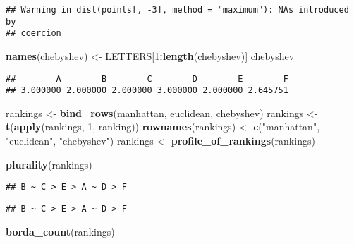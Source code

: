 \documentclass[]{article}
\newenvironment{Shaded}{\begin{snugshade}}{\end{snugshade}}
\newcommand{\DecValTok}[1]{\textcolor[rgb]{0.00,0.00,0.81}{#1}}
\newcommand{\KeywordTok}[1]{\textcolor[rgb]{0.13,0.29,0.53}{\textbf{#1}}}
\newcommand{\NormalTok}[1]{#1}
\newcommand{\OperatorTok}[1]{\textcolor[rgb]{0.81,0.36,0.00}{\textbf{#1}}}
\newcommand{\StringTok}[1]{\textcolor[rgb]{0.31,0.60,0.02}{#1}}
\begin{document}
\begin{verbatim}
## Warning in dist(points[, -3], method = "maximum"): NAs introduced by
## coercion
\end{verbatim}

\begin{Shaded}
\begin{Highlighting}[]
\KeywordTok{names}\NormalTok{(chebyshev) <-}\StringTok{ }\NormalTok{LETTERS[}\DecValTok{1}\OperatorTok{:}\KeywordTok{length}\NormalTok{(chebyshev)]}
\NormalTok{chebyshev}
\end{Highlighting}
\end{Shaded}

\begin{verbatim}
##        A        B        C        D        E        F 
## 3.000000 2.000000 2.000000 3.000000 2.000000 2.645751
\end{verbatim}

\begin{Shaded}
\begin{Highlighting}[]
\NormalTok{rankings <-}\StringTok{ }\KeywordTok{bind_rows}\NormalTok{(manhattan, }
\NormalTok{          euclidean,}
\NormalTok{          chebyshev)}
\NormalTok{rankings <-}\StringTok{ }\KeywordTok{t}\NormalTok{(}\KeywordTok{apply}\NormalTok{(rankings, }\DecValTok{1}\NormalTok{, ranking))}
\KeywordTok{rownames}\NormalTok{(rankings) <-}\StringTok{ }\KeywordTok{c}\NormalTok{(}\StringTok{"manhattan"}\NormalTok{, }\StringTok{"euclidean"}\NormalTok{, }\StringTok{"chebyshev"}\NormalTok{)}
\NormalTok{rankings <-}\StringTok{ }\KeywordTok{profile_of_rankings}\NormalTok{(rankings)}
\end{Highlighting}
\end{Shaded}

\begin{Shaded}
\begin{Highlighting}[]
\KeywordTok{plurality}\NormalTok{(rankings)}
\end{Highlighting}
\end{Shaded}

\begin{verbatim}
## B ~ C > E > A ~ D > F
\end{verbatim}

\begin{verbatim}
## B ~ C > E > A ~ D > F
\end{verbatim}

\begin{Shaded}
\begin{Highlighting}[]
\KeywordTok{borda_count}\NormalTok{(rankings)}
\end{Highlighting}
\end{Shaded}
\end{document}
